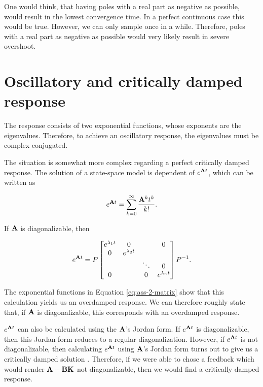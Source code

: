 \documentclass[11pt,titlepage]{report}
\begin{document}
One would think, that having poles with a real part as negative as possible, would result in the lowest convergence time. In a perfect continuous case this would be true. However, we can only sample once in a while. Therefore, poles with a real part as negative as possible would very likely result in severe overshoot.

\section{Oscillatory and critically damped response}
\label{sec:ass-2-behav}
The response consists of two exponential functions, whose exponents are the eigenvalues. Therefore, to achieve an oscillatory response, the eigenvalues must be complex conjugated.

The situation is somewhat more complex regarding a perfect critically damped response. The solution of a state-space model is dependent of $e^{\mathbf{A} t}$, which can be written as

\begin{equation}
	e^{\mathbf{A} t} = \sum_{k=0}^{\infty} \frac{\mathbf{A}^k t^k}{k!}.
\end{equation}

If $\mathbf{A}$ is diagonalizable, then

\begin{equation} \label{eq:ass-2-matrix}
	e^{\mathbf{A} t} = P \begin{bmatrix}
		e^{\lambda_1 t} & 0 & & 0 \\
		0 & e^{\lambda_2 t} & & \\
		 & & \ddots & 0 \\
		 0 & & 0 & e^{\lambda_n t}
	\end{bmatrix} P^{-1}.
\end{equation}

The exponential functions in Equation \ref{eq:ass-2-matrix} show that this calculation yields us an overdamped response. We can therefore roughly state that, if $\mathbf{A}$ is diagonalizable, this corresponds with an overdamped response.

$e^{\mathbf{A} t}$ can also be calculated using the $\mathbf{A}$'s Jordan form. If $e^{\mathbf{A} t}$ is diagonalizable, then this Jordan form reduces to a regular diagonalization. However, if $e^{\mathbf{A} t}$ is not diagonalizable, then calculating $e^{\mathbf{A} t}$ using $\mathbf{A}$'s Jordan form turns out to give us a critically damped solution \cite{jordan-solution}. Therefore, if we were able to chose a feedback which would render $\mathbf{A} - \mathbf{B} \mathbf{K}$ not diagonalizable, then we would find a critically damped response.
\end{document}
